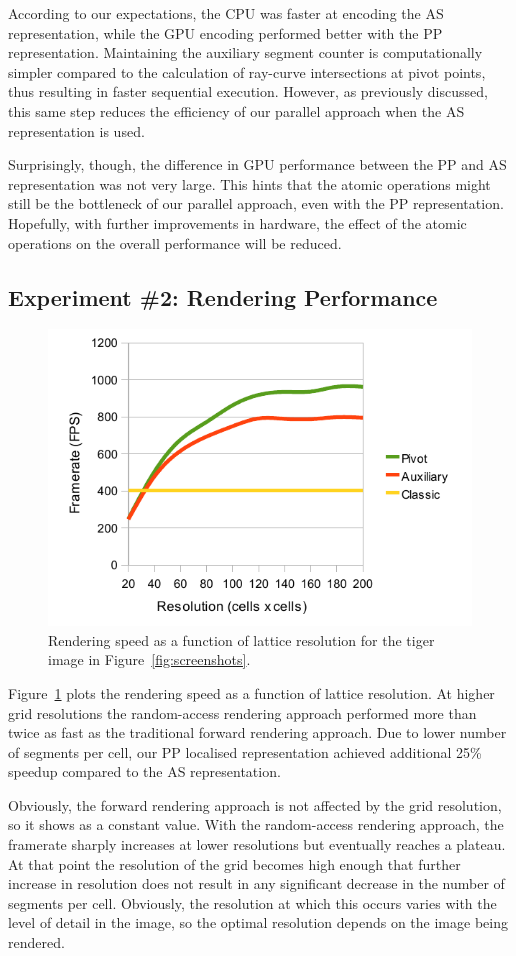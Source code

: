 \documentclass[11pt,a4paper,twoside]{article}
\begin{document}
According to our expectations, the CPU was faster at encoding the AS representation, while the GPU encoding performed better with the PP representation. Maintaining the auxiliary segment counter is computationally simpler compared to the calculation of ray-curve intersections at pivot points, thus resulting in faster sequential execution. However, as previously discussed, this same step reduces the efficiency of our parallel approach when the AS representation is used.

Surprisingly, though, the difference in GPU performance between the PP and AS representation was not very large. This hints that the atomic operations might still be the bottleneck of our parallel approach, even with the PP representation. Hopefully, with further improvements in hardware, the effect of the atomic operations on the overall performance will be reduced.

\subsection {Experiment \#2: Rendering Performance}

\begin {figure} [h]
	\centering
	\includegraphics[width=0.6\columnwidth] {figures/graph_grid_render}
	\caption {Rendering speed as a function of lattice resolution for the tiger image in Figure~\ref{fig:screenshots}.}
	\label {fig:graph_grid_render}
\end {figure}

Figure~\ref{fig:graph_grid_render} plots the rendering speed as a function of lattice resolution. At higher grid resolutions the random-access rendering approach performed more than twice as fast as the traditional forward rendering approach. Due to lower number of segments per cell, our PP localised representation achieved additional 25\% speedup compared to the AS representation.

Obviously, the forward rendering approach is not affected by the grid resolution, so it shows as a constant value. With the random-access rendering approach, the framerate sharply increases at lower resolutions but eventually reaches a plateau. At that point the resolution of the grid becomes high enough that further increase in resolution does not result in any significant decrease in the number of segments per cell. Obviously, the resolution at which this occurs varies with the level of detail in the image, so the optimal resolution depends on the image being rendered.
\end{document}

